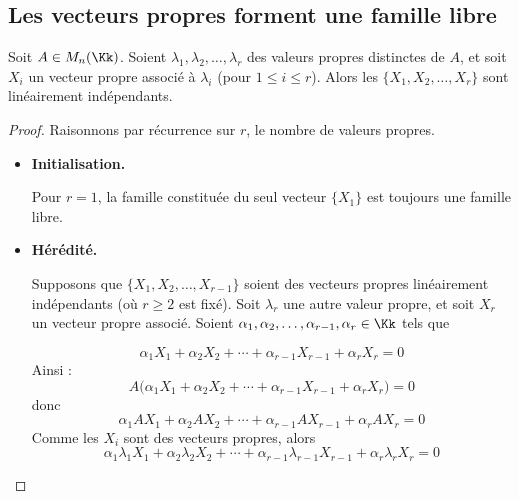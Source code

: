 \documentclass[11pt, class=report,crop=false]{standalone}
\begin{document}
\subsection{Les vecteurs propres forment une famille libre}

\begin{theoreme}
\label{th:vplibre}
Soit $A \in M_n(\Kk)$.
Soient $\lambda_1,\lambda_2,\dots,\lambda_r$ des valeurs propres distinctes de 
$A$, et soit $X_i$ un vecteur propre associé à $\lambda_i$ (pour $1\leq i\leq r$).
Alors les $\{ X_1,X_2,\dots,X_r\}$ sont linéairement indépendants.
\end{theoreme}



\begin{proof}
Raisonnons par récurrence sur $r$, le nombre de valeurs propres.

\begin{itemize}
  \item \textbf{Initialisation.}
  
  Pour $r=1$, la famille constituée du seul vecteur $\{X_1\}$ est toujours une famille libre.
  
  
  \item \textbf{Hérédité.}
  
  Supposons que $\{ X_1,X_2,\dots,X_{r-1}\}$ soient des vecteurs propres linéairement indépendants (où $r\ge 2$ est fixé). Soit $\lambda_r$ une autre valeur propre, et soit $X_r$ un vecteur propre associé. 
  Soient $\alpha_1,\alpha_2,\ldots,\alpha_{r-1}, \alpha_r \in \Kk$ tels que
 
\begin{equation}
\label{eq:vp1}
\alpha_1 X_1 + \alpha_2 X_2 +\cdots + \alpha_{r-1} X_{r-1} + \alpha_r X_r = 0
\end{equation}
Ainsi :
$$A \big(\alpha_1 X_1 + \alpha_2 X_2 +\cdots + \alpha_{r-1} X_{r-1} + \alpha_r X_r \big) = 0 $$
donc
$$\alpha_1 A X_1 + \alpha_2 A X_2 +\cdots + \alpha_{r-1} A X_{r-1} + \alpha_r A X_r  = 0 $$
Comme les $X_i$ sont des vecteurs propres, alors
\begin{equation}
\label{eq:vp2}
\alpha_1 \lambda_1 X_1 + \alpha_2 \lambda_2 X_2 +\cdots + \alpha_{r-1} \lambda_{r-1} X_{r-1} + \alpha_r \lambda_r X_r  = 0
\end{equation}


\end{itemize}
\end{proof}
\end{document}
